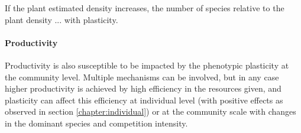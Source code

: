 If the plant estimated density increases, the number of species relative to the plant density ... with plasticity.

\begin{figure}%
    \classiccaptionstyle
{}
\end{figure}



\paragraph{Productivity}

Productivity is also susceptible to be impacted by the phenotypic plasticity at the community level. Multiple mechanisms can be involved, but in any case higher productivity is achieved by high efficiency in the resources given, and plasticity can affect this efficiency at individual level (with positive effects as observed in section \ref{chapter:individual}) or at the community scale with changes in the dominant species and competition intensity.

